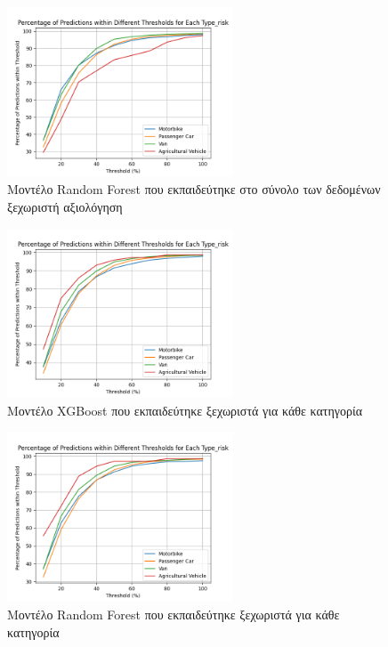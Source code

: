\documentclass{llncs}
\begin{document}
\begin{figure}
    \begin{center}
        \includegraphics[width=0.6\textwidth]{images/combined_trained_individual_thresholds_random_forest.png}
    \end{center}
    \caption{Μοντέλο Random Forest που εκπαιδεύτηκε στο σύνολο των δεδομένων ξεχωριστή αξιολόγηση}  
    \label{fig:random_forest_result_all_individual}  
\end{figure}

\begin{figure}
    \begin{center}
        \includegraphics[width=0.6\textwidth]{images/individual_thresholds_xgb.png}
    \end{center}
    \caption{Μοντέλο XGBoost που εκπαιδεύτηκε ξεχωριστά για κάθε κατηγορία}  
    \label{fig:XGBoost_result_cat}  
\end{figure}

\begin{figure}
    \begin{center}
        \includegraphics[width=0.6\textwidth]{images/individual_thresholds_random_forest.png}
    \end{center}
    \caption{Μοντέλο Random Forest που εκπαιδεύτηκε ξεχωριστά για κάθε κατηγορία}  
    \label{fig:random_forest_result_cat}  
\end{figure}
\end{document}
